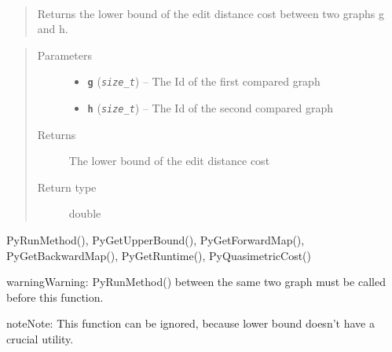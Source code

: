 \documentclass[letterpaper,10pt,english]{sphinxmanual}
\begin{document}
\begin{fulllineitems}
\label{doc:PythonGedLib.PyGetLowerBound}~\begin{quote}

Returns the lower bound of the edit distance cost between two graphs g and h.
\end{quote}
\begin{quote}\begin{description}
\item[{Parameters}] \leavevmode\begin{itemize}
\item {} 
\textbf{\texttt{g}} (\emph{\texttt{size\_t}}) -- The Id of the first compared graph

\item {} 
\textbf{\texttt{h}} (\emph{\texttt{size\_t}}) -- The Id of the second compared graph

\end{itemize}

\item[{Returns}] \leavevmode
The lower bound of the edit distance cost

\item[{Return type}] \leavevmode
double

\end{description}\end{quote}




PyRunMethod(), PyGetUpperBound(), PyGetForwardMap(), PyGetBackwardMap(), PyGetRuntime(), PyQuasimetricCost()



\begin{notice}{warning}{Warning:}
PyRunMethod() between the same two graph must be called before this function.
\end{notice}

\begin{notice}{note}{Note:}
This function can be ignored, because lower bound doesn't have a crucial utility.
\end{notice}

\end{fulllineitems}

\end{document}
